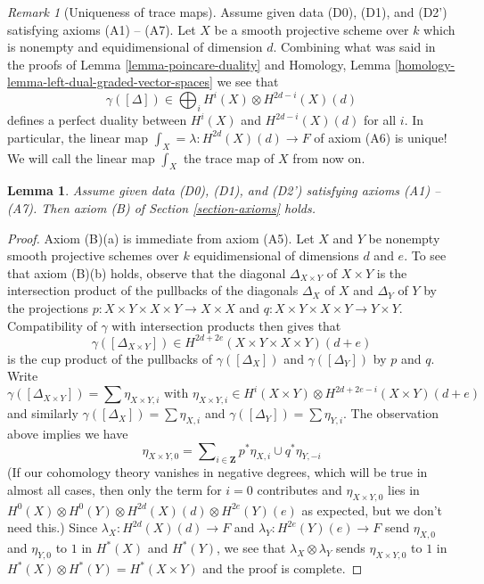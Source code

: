 \documentclass{stacks-project}
\theoremstyle{plain}
\newtheorem{lemma}[subsection]{Lemma}
\theoremstyle{definition}
\theoremstyle{remark}
\newtheorem{remark}[subsection]{Remark}
\numberwithin{equation}{subsection}
\begin{document}
\begin{remark}[Uniqueness of trace maps]
\label{remark-trace}
Assume given data (D0), (D1), and (D2') satisfying axioms (A1) -- (A7).
Let $X$ be a smooth projective scheme over $k$ which is nonempty
and equidimensional of dimension $d$. Combining what was said in
the proofs of Lemma \ref{lemma-poincare-duality} and
Homology, Lemma \ref{homology-lemma-left-dual-graded-vector-spaces}
we see that
$$
\gamma([\Delta]) \in \bigoplus\nolimits_i H^i(X) \otimes H^{2d - i}(X)(d)
$$
defines a perfect duality between $H^i(X)$ and $H^{2d - i}(X)(d)$
for all $i$.
In particular, the linear map $\int_X = \lambda : H^{2d}(X)(d) \to F$ of
axiom (A6) is unique! We will call the linear map $\int_X$ the trace map
of $X$ from now on.
\end{remark}

\begin{lemma}
\label{lemma-trace-product}
Assume given data (D0), (D1), and (D2') satisfying axioms (A1) -- (A7).
Then axiom (B) of Section \ref{section-axioms} holds.
\end{lemma}

\begin{proof}
Axiom (B)(a) is immediate from axiom (A5).
Let $X$ and $Y$ be nonempty smooth projective schemes over $k$
equidimensional of dimensions $d$ and $e$. To see that axiom (B)(b)
holds, observe that the diagonal $\Delta_{X \times Y}$ of $X \times Y$
is the intersection product of the pullbacks of the diagonals
$\Delta_X$ of $X$ and $\Delta_Y$ of $Y$ by the projections
$p : X \times Y \times X \times Y \to X \times X$ and
$q : X \times Y \times X \times Y \to Y \times Y$.
Compatibility of $\gamma$ with intersection products then gives
that
$$
\gamma([\Delta_{X \times Y}]) \in
H^{2d + 2e}(X \times Y \times X \times Y)(d + e)
$$
is the cup product of the pullbacks of $\gamma([\Delta_X])$
and $\gamma([\Delta_Y])$ by $p$ and $q$. Write
$$
\gamma([\Delta_{X \times Y}]) = \sum \eta_{X \times Y, i}
\text{ with }
\eta_{X \times Y, i} \in
H^i(X \times Y) \otimes H^{2d + 2e - i}(X \times Y)(d + e)
$$
and similarly $\gamma([\Delta_X]) = \sum \eta_{X, i}$ and
$\gamma([\Delta_Y]) = \sum \eta_{Y, i}$. The observation above
implies we have
$$
\eta_{X \times Y, 0} =
\sum\nolimits_{i \in \mathbf{Z}} p^*\eta_{X, i} \cup q^*\eta_{Y, -i}
$$
(If our cohomology theory vanishes in negative degrees, which will
be true in almost all cases, then only the term for $i = 0$ contributes
and $\eta_{X \times Y, 0}$ lies in
$H^0(X) \otimes H^0(Y) \otimes H^{2d}(X)(d) \otimes H^{2e}(Y)(e)$ as expected,
but we don't need this.) Since $\lambda_X : H^{2d}(X)(d) \to F$ and 
$\lambda_Y : H^{2e}(Y)(e) \to F$ send $\eta_{X, 0}$ and $\eta_{Y, 0}$
to $1$ in $H^*(X)$ and $H^*(Y)$, we see that $\lambda_X \otimes \lambda_Y$
sends $\eta_{X \times Y, 0}$ to $1$ in
$H^*(X) \otimes H^*(Y) = H^*(X \times Y)$ and the proof is complete.
\end{proof}
\end{document}

